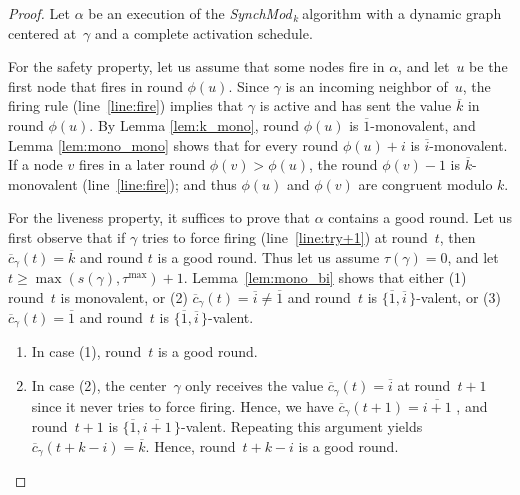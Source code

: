 \documentclass{article}
\newcommand{\cent}{\gamma}
\newcommand{\tf}{\phi}
\newcommand{\try}{\tau}
\newcommand{\SM}{{\em SynchMod}$_{\,k}\ $}
\begin{document}
\begin{proof}
Let $\alpha$ be an execution of the \SM algorithm with a dynamic graph centered at~$\cent$ 
	and a complete activation schedule.
	
For the safety property, let us assume that some nodes fire in $\alpha$, and let~$u$ be the first node that fires in round $\tf(u)$.
Since $\cent $ is an incoming neighbor of~$u$, the firing rule (line~\ref{line:fire}) implies that $\cent$ is active
	and has sent the value  $\overline{k}$ in round $\tf(u)$.
By Lemma \ref{lem:k_mono},   round $\tf(u)$ is $\overline{1}$-monovalent, and
	Lemma \ref{lem:mono_mono} shows that for every round $\tf(u)+i$ is $\overline{i}$-monovalent.
If a node $v$ fires in a later round $\tf(v) > \tf(u)$, the round $\tf(v)-1$  is $\overline{k}$-monovalent (line~\ref{line:fire});
	and thus $\tf(u)$ and $\tf(v)$ are congruent modulo $k$.
		
For the liveness property, it suffices to prove that  $\alpha$ contains a good round.
Let us first observe that if $\cent$ tries to force firing (line~\ref{line:try+1}) at round~$t$,
	 then $ \overline{c}_{\cent}(t) = \overline{k}$ and round $t$ is a good round.
Thus let us assume  $\try(\cent) = 0$, and  let $t \geq \max (s(\cent) , \try^{\max}) +1$.
Lemma~\ref{lem:mono_bi}  shows that either (1) round~$t$ is monovalent, 
	or (2) $ \overline{c}_{\cent}(t) = \overline{i} \neq  \overline{1} $ and round~$t$ is $ \{\overline{1}, \overline{i} \, \}$-valent,
	or (3) $ \overline{c}_{\cent}(t) = \overline{1}$ and round~$t$ is $ \{\overline{1}, \overline{i} \, \}$-valent.
\begin{enumerate}
\item In case (1), round~$t$ is a good round.

\item In case (2), the center~$\cent$ only receives the value $ \overline{c}_{\cent}(t) = \overline{i}$ at round~$t+1$ 
since it never tries to force firing.
Hence, we have $ \overline{c}_{\cent}(t + 1)  = \overline{i +1} $ , and round~$t+1 $ is $ \{\overline{1}, \overline{i+1} \, \}$-valent.
Repeating this argument yields $ \overline{c}_{\cent}(t + k-i )  = \overline{ k } $.
Hence, round~$t +k-i$ is a good round.


\end{enumerate}
\end{proof}
\end{document}
